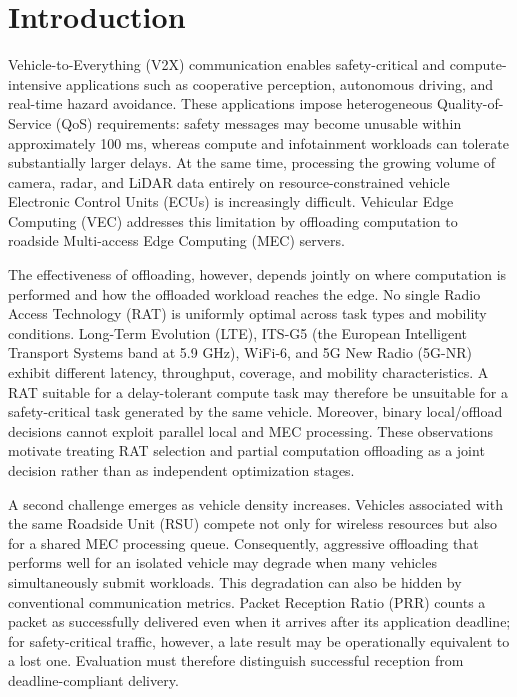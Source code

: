 \section{Introduction}

Vehicle-to-Everything (V2X) communication enables safety-critical and compute-intensive applications such as cooperative perception, autonomous driving, and real-time hazard avoidance. These applications impose heterogeneous Quality-of-Service (QoS) requirements: safety messages may become unusable within approximately 100 ms, whereas compute and infotainment workloads can tolerate substantially larger delays. At the same time, processing the growing volume of camera, radar, and LiDAR data entirely on resource-constrained vehicle Electronic Control Units (ECUs) is increasingly difficult. Vehicular Edge Computing (VEC) addresses this limitation by offloading computation to roadside Multi-access Edge Computing (MEC) servers.

The effectiveness of offloading, however, depends jointly on where computation is performed and how the offloaded workload reaches the edge. No single Radio Access Technology (RAT) is uniformly optimal across task types and mobility conditions. Long-Term Evolution (LTE), ITS-G5 (the European Intelligent Transport Systems band at 5.9 GHz), WiFi-6, and 5G New Radio (5G-NR) exhibit different latency, throughput, coverage, and mobility characteristics. A RAT suitable for a delay-tolerant compute task may therefore be unsuitable for a safety-critical task generated by the same vehicle. Moreover, binary local/offload decisions cannot exploit parallel local and MEC processing. These observations motivate treating RAT selection and partial computation offloading as a joint decision rather than as independent optimization stages.

A second challenge emerges as vehicle density increases. Vehicles associated with the same Roadside Unit (RSU) compete not only for wireless resources but also for a shared MEC processing queue. Consequently, aggressive offloading that performs well for an isolated vehicle may degrade when many vehicles simultaneously submit workloads. This degradation can also be hidden by conventional communication metrics. Packet Reception Ratio (PRR) counts a packet as successfully delivered even when it arrives after its application deadline; for safety-critical traffic, however, a late result may be operationally equivalent to a lost one. Evaluation must therefore distinguish successful reception from deadline-compliant delivery.

